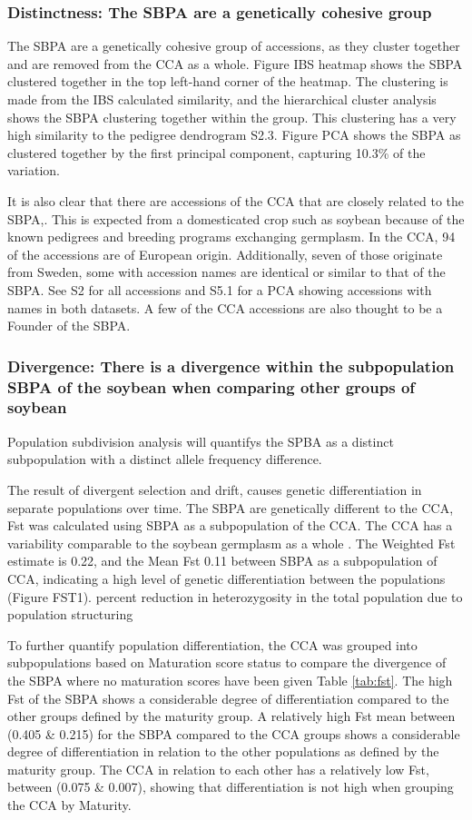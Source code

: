 \documentclass[9pt, twocolumn,twoside]{gsajnl}
\begin{document}
\subsubsection{Distinctness: The SBPA are a genetically cohesive group}
The SBPA are a genetically cohesive group of accessions, as they cluster together and are removed from the CCA as a whole. Figure IBS heatmap shows the SBPA clustered together in the top left-hand corner of the heatmap. The clustering is made from the IBS calculated similarity, and the hierarchical cluster analysis shows the SBPA clustering together within the group. This clustering has a very high similarity to the  pedigree dendrogram S2.3. 
Figure PCA shows the SBPA as clustered together by the first principal component, capturing 10.3\% of the variation.  

It is also clear that there are accessions of the CCA that are closely related to the SBPA,. This is expected from a domesticated crop such as soybean because of the known pedigrees and breeding programs exchanging germplasm.  In the CCA, 94 of the accessions are of European origin. Additionally, seven of those originate from Sweden, some with accession names are identical or similar to that of the SBPA. See S2 for all accessions and  S5.1 for a PCA showing accessions with names in both datasets. A few of the CCA accessions are also thought to be a Founder of the SBPA. 

\subsubsection{Divergence: There is a divergence within the subpopulation SBPA of the soybean when comparing other groups of soybean}
Population subdivision analysis will quantifys the SPBA as a distinct subpopulation with a distinct allele frequency difference.

The result of divergent selection and drift, causes genetic differentiation in separate populations over time.  
The SBPA are genetically different to the CCA, Fst was calculated using SBPA as a subpopulation of the CCA. The CCA has a variability comparable to the soybean germplasm as a whole \cite{haupt20}. 
The Weighted Fst estimate is  0.22, and the Mean Fst 0.11 between SBPA as a subpopulation of CCA, indicating a high level of genetic differentiation between the populations (Figure FST1).  
percent reduction in heterozygosity in the total population due to population structuring

To further quantify population differentiation, the CCA was grouped into subpopulations based on Maturation score status to compare the divergence of the SBPA where no maturation scores have been given Table  \ref{tab:fst}. 
The high Fst of the SBPA shows a considerable degree of differentiation compared to the other groups defined by the maturity group. A relatively high Fst mean between (0.405 \& 0.215) for the SBPA compared to the CCA groups shows a considerable degree of differentiation in relation to the other populations as defined by the maturity group. The CCA in relation to each other has a relatively low Fst, between (0.075 \& 0.007), showing that differentiation is not high when grouping the CCA by Maturity. 
\end{document}
